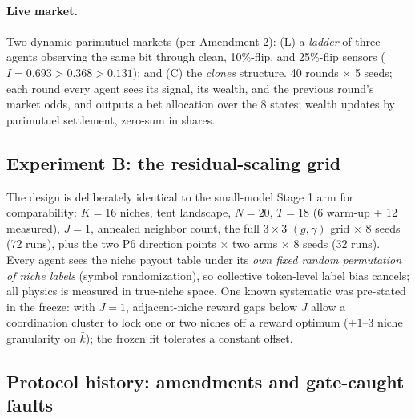 \documentclass{article} %
\begin{document}
\paragraph{Live market.} Two dynamic parimutuel markets (per Amendment 2): (L) a \emph{ladder} of three agents observing the same bit through clean, 10\%-flip, and 25\%-flip sensors ($I = 0.693 > 0.368 > 0.131$); and (C) the \emph{clones} structure. 40 rounds $\times$ 5 seeds; each round every agent sees its signal, its wealth, and the previous round's market odds, and outputs a bet allocation over the 8 states; wealth updates by parimutuel settlement, zero-sum in shares.

\subsection{Experiment B: the residual-scaling grid}
\label{sec:design-b}

The design is deliberately identical to the small-model Stage 1 arm for comparability: $K = 16$ niches, tent landscape, $N = 20$, $T = 18$ (6 warm-up + 12 measured), $J = 1$, annealed neighbor count, the full $3\times3$ $(g,\gamma)$ grid $\times$ 8 seeds (72 runs), plus the two P6 direction points $\times$ two arms $\times$ 8 seeds (32 runs). Every agent sees the niche payout table under its \emph{own fixed random permutation of niche labels} (symbol randomization), so collective token-level label bias cancels; all physics is measured in true-niche space. One known systematic was pre-stated in the freeze: with $J = 1$, adjacent-niche reward gaps below $J$ allow a coordination cluster to lock one or two niches off a reward optimum ($\pm 1$--$3$ niche granularity on $\bar k$); the frozen fit tolerates a constant offset.

\subsection{Protocol history: amendments and gate-caught faults}
\label{sec:amendments}
\end{document}
